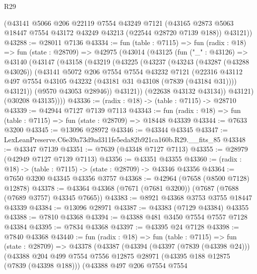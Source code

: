 \begin{lexlean}{R29}
\begin{coremodule}
      (@43141
        @5066
        @206
        @22119
        @7554
        @43249
        @7121
        (@43165 @2873 @5063 @18447 @7554 @43172 @43249 @43213 (@22544 @28720 @7139 @188))
        @43121))
@43288 := @28011 @7136
@43334 := fun (table : @7115) =>
  fun (radix : @18) =>
  fun (state : @28709) =>
  @42975
    (@43014
      (@43125
        (fun ("_" : @43126) =>
        @43140
          (@43147
            (@43158
              (@43219
                (@43225
                  (@43237
                    (@43243
                      (@43287 (@43288 @43026))
                      (@43141
                        @5072
                        @206
                        @7554
                        @7554
                        @43232
                        @7121
                        (@22316
                          @43112
                          @497
                          @7554
                          @43105
                          @43232
                          (@43181 @31 @43108 (@7839 (@43184 @31))))
                        @43121))
                    (@9570 @43053 @28946))
                  @43121))
              (@22638 @43132 @43134))
            @43121)
          (@30208 @43135))))
@43336 := (radix : @18) -> (table : @7115) -> @28710
@43339 := @42944 @7127 @7139 @7113
@43343 := fun (radix : @18) => fun (table : @7115) => fun (state : @28709) => @18448 @43339
@43344 := @7633 @3200
@43345 := @13096 @28972
@43346 := @43344 @43345
@43347 := LexLeanPreserve.C6e39a73d9ad311fe5eda82b921ca160b.R29.__fits_85
@43348 := @43347 @7139
@43351 := @7639 (@43348 @7127 @7113)
@43355 := @28979 (@42949 @7127 @7139 @7113)
@43356 := @43351 @43355
@43360 := (radix : @18) -> (table : @7115) -> (state : @28709) -> @43346 @43356
@43364 := @7650 @3200 @43345 @43356 @3757
@43368 := @42964 (@7658 (@8500 @7128) @12878)
@43378 := @43364 @43368 (@7671 (@7681 @3200)) (@7687 (@7688 (@7689 @3757) @43345 @7665))
@43383 := @8921 @43368 @3753 @3755 @18447 @43339
@43384 := @13096 @28971
@43387 := @43383 (@7129 @43384) @43355
@43388 := @7810 @43368
@43394 := @43388 @481 @3450 @7554 @7557 @7128 @43384
@43395 := @7834 @43368
@43397 := @43395 @24 @7128
@43398 := @7840 @43368
@43440 := fun (radix : @18) =>
  fun (table : @7115) =>
  fun (state : @28709) =>
  @43378
    (@43387
      (@43394
        (@43397 (@7839 (@43398 @24)))
        (@43388
          @204
          @499
          @7554
          @7556
          @12875
          @28971
          (@43395 @188 @12875 (@7839 (@43398 @188)))
          (@43388
            @497
            @206
            @7554
            @7554

\end{coremodule}
\end{lexlean}

